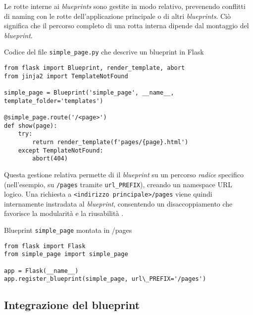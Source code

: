 Le rotte interne ai \textit{blueprints} sono gestite in modo relativo, prevenendo conflitti di naming con le rotte dell'applicazione principale o di altri \textit{blueprints}. Ciò significa che il percorso completo di una rotta interna dipende dal montaggio del \textit{blueprint}.

\begin{listing}[!ht]
\caption{Codice del file \texttt{simple\_page.py} che descrive un blueprint in Flask}
\label{lst:flask-blueprint} %
\begin{verbatim}
from flask import Blueprint, render_template, abort
from jinja2 import TemplateNotFound

simple_page = Blueprint('simple_page', __name__, template_folder='templates')

@simple_page.route('/<page>')
def show(page):
    try:
        return render_template(f'pages/{page}.html')
    except TemplateNotFound:
        abort(404)
\end{verbatim}
\end{listing}

Questa gestione relativa permette di  il \textit{blueprint} su un percorso \textit{radice} specifico (nell'esempio, su \texttt{/pages} tramite \texttt{url\_PREFIX}), creando un namespace URL logico. Una richiesta a \texttt{<indirizzo principale>/pages} viene quindi internamente instradata al \textit{blueprint}, consentendo un disaccoppiamento che favorisce la modularità e la riusabilità \cite{palets_blueprints}.

\begin{listing}[!ht]
\caption{Blueprint \texttt{simple\_page} montata in /pages}
\label{lst:python_blueprint_registration} %
\begin{verbatim}
from flask import Flask
from simple_page import simple_page

app = Flask(__name__)
app.register_blueprint(simple_page, url\_PREFIX='/pages')
\end{verbatim}
\end{listing}

\subsection{Integrazione del blueprint}


